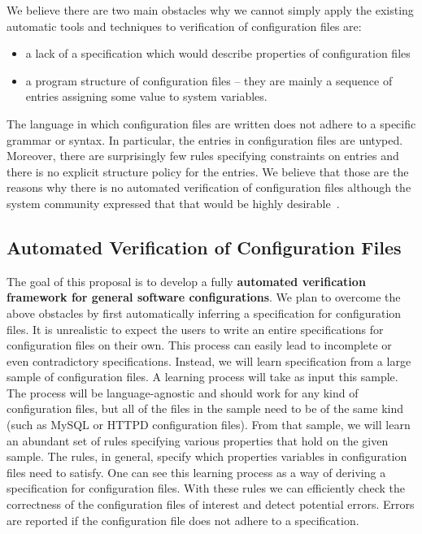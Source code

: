 We believe there are two main obstacles 
why we cannot simply apply the existing automatic 
tools and techniques to verification of configuration files are:
\begin{itemize}
\item a lack
of a specification which would describe properties of configuration files
\item a program structure of configuration files -- they
are mainly a sequence of entries assigning some value to system variables. 
\end{itemize}
The language in which configuration files are written does 
not adhere to a specific grammar or syntax. In particular, the
entries in configuration files are untyped. Moreover, there are surprisingly few rules specifying constraints on entries and there
is no explicit structure policy for the entries.
We believe that those are the reasons why there is no automated verification of configuration 
files although the system community expressed that that would be highly
desirable~\cite{wang04automatic, zhang14encore, xu15systems}.


\subsection{Automated Verification of Configuration Files}
\label{sec:intro-goal}

The goal of this proposal is to develop a fully {\bf {automated 
verification  framework for general software configurations}}. We plan to
overcome the above obstacles by first automatically inferring a
specification for configuration files. It is unrealistic to expect the 
users to write an entire specifications for configuration files on their own. 
This process can easily lead to incomplete or even contradictory 
specifications. Instead, we will learn specification from 
a large sample of 
configuration files. A learning process will take as input this 
sample. The process will be language-agnostic and should work for any kind 
of configuration files,  but all of the files in the sample need to be of 
the same kind (such as MySQL or 
HTTPD configuration files). From that sample, we will learn an abundant set of rules 
specifying various properties that hold on the given sample. The rules, in general, 
specify which properties variables in configuration files need to satisfy. One can see this learning process as 
a way of deriving  a specification for configuration files. With these  rules we can efficiently check 
the correctness of the configuration files of interest and detect 
potential errors. Errors are reported if the configuration file does not 
adhere to a specification.

